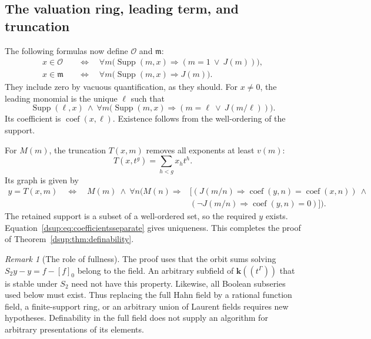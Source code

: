 \documentclass[11pt,oneside]{article}
\numberwithin{equation}{section}
\theoremstyle{definition}
\theoremstyle{remark}
\newtheorem{remark}[theorem]{Remark}
\newcommand{\kk}{\mathbf k}
\newcommand{\OO}{\mathcal O}
\newcommand{\mm}{\mathfrak m}
\newcommand{\coef}{\operatorname{coef}}
\DeclareMathOperator{\Supp}{Supp}
\begin{document}
\subsection{The valuation ring, leading term, and truncation}

The following formulas now define $\OO$ and $\mm$:
\begin{align}
 x\in\OO&\quad\Longleftrightarrow\quad
  \forall m\bigl(\Supp(m,x)\Rightarrow(m=1\ \lor\ J(m))\bigr),\label{dsup:eq:defO}\\
 x\in\mm&\quad\Longleftrightarrow\quad
  \forall m\bigl(\Supp(m,x)\Rightarrow J(m)\bigr).\label{dsup:eq:defm}
\end{align}
They include zero by vacuous quantification, as they should. For $x\ne0$,
the leading monomial is the unique $\ell$ such that
\begin{equation}\label{dsup:eq:leadingformula}
 \Supp(\ell,x)\ \land\
 \forall m\bigl(\Supp(m,x)\Rightarrow(m=\ell\ \lor\ J(m/\ell))\bigr).
\end{equation}
Its coefficient is $\coef(x,\ell)$. Existence follows from the
well-ordering of the support.

For $M(m)$, the truncation $T(x,m)$ removes all exponents at least $v(m)$:
\[
 T(x,t^g)=\sum_{h<g}x_ht^h.
\]
Its graph is given by
\begin{equation}\label{dsup:eq:truncformula}
 \begin{split}
 y=T(x,m)\quad\Longleftrightarrow\quad M(m)\ \land\
 \forall n\bigl(M(n)\Rightarrow{}&
 [(J(m/n)\Rightarrow\coef(y,n)=\coef(x,n))\ \land\ {}\\[-2pt]
 & (\neg J(m/n)\Rightarrow\coef(y,n)=0)]\bigr).
 \end{split}
\end{equation}
The retained support is a subset of a well-ordered set, so the required
$y$ exists. Equation~\eqref{dsup:eq:coefficientsseparate} gives uniqueness.
This completes the proof of Theorem~\ref{dsup:thm:definability}.

\begin{remark}[The role of fullness]
The proof uses that the orbit sums solving $S_2y-y=f-[f]_0$ belong to the
field. An arbitrary subfield of $\kk((t^\Gamma))$ that is stable under
$S_2$ need not have this property. Likewise, all Boolean subseries used
below must exist. Thus replacing the full Hahn field by a rational
function field, a finite-support ring, or an arbitrary union of Laurent
fields requires new hypotheses. Definability in the full field does not
supply an algorithm for arbitrary presentations of its elements.
\end{remark}
\end{document}
